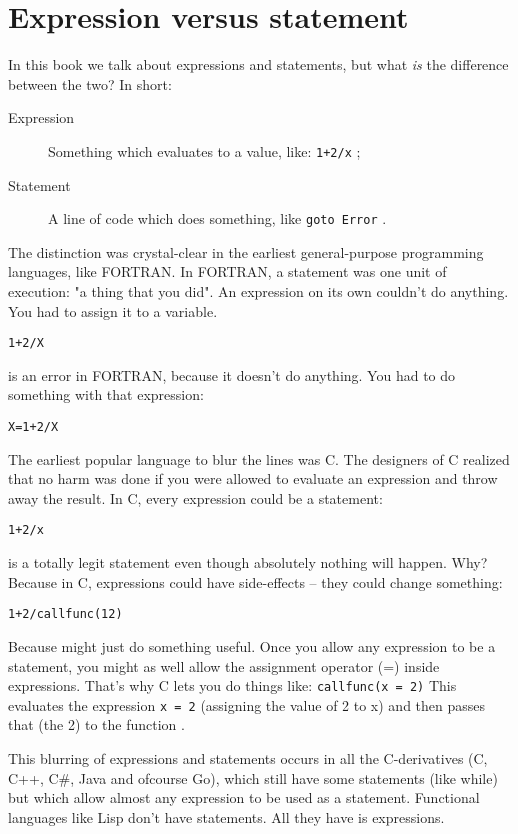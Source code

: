 \section{Expression versus statement}
\label{sec:expression versus statement}
In this book we talk about expressions and statements, but%
what \emph{is} the difference between the two?
In short:
\begin{description}
\item[Expression] Something which evaluates to a value, like:
\lstinline{1+2/x} ;
\item[Statement] A line of code which does something, like
\lstinline{goto Error} .
\end{description}

The distinction was crystal-clear in the earliest general-purpose
programming languages, like FORTRAN. In FORTRAN, a statement was one
unit of execution: "a thing that you did". 
An expression on its own couldn't do anything. You had to assign it to a
variable.
\begin{alltt}
1 + 2 / X
\end{alltt}
\noindent{}is an error in FORTRAN, because it doesn't do anything. You had to do
something with that expression: 
\begin{alltt}{X = 1 + 2 / X}\end{alltt}

\newpage

The earliest popular language to blur the lines was C. The designers of
C realized that no harm was done if you were allowed to evaluate an
expression and throw away the result. In C, every expression could be a
statement: 
\begin{alltt}1 + 2 / x\end{alltt}
\noindent{}is a totally legit statement even though absolutely nothing will happen.
Why? Because in C, expressions could have side-effects -- they could
change something: \begin{alltt}{1 + 2 / callfunc(12)}\end{alltt}

\noindent{}Because  might just do something useful.
Once you allow any expression to be a statement, you might as well allow
the assignment operator (=) inside expressions. That's why C lets you do
things like: \lstinline{callfunc(x = 2)}
This evaluates the expression \lstinline{x = 2} (assigning the value of 2 to x) and
then passes that (the 2) to the function .

This blurring of expressions and statements occurs in all the
C-derivatives (C, C++, C\#, Java and ofcourse Go), which still have some
statements (like while) but which allow almost any expression to be used
as a statement. Functional languages like Lisp don't have statements.
All they have is expressions. 
